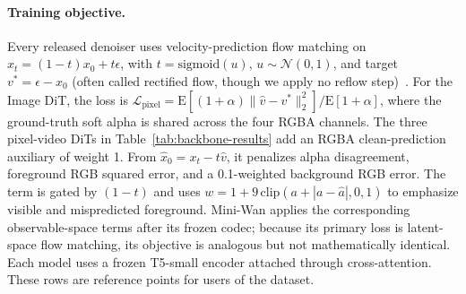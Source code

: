 \documentclass[10pt,twocolumn,letterpaper]{article}
\begin{document}
\paragraph{Training objective.} Every released denoiser uses velocity-prediction flow matching on
$x_t=(1-t)x_0+t\epsilon$, with $t=\mathrm{sigmoid}(u)$, $u\sim\mathcal N(0,1)$, and target
$v^*=\epsilon-x_0$ (often called rectified flow, though we apply no reflow step)~\cite{peebles2023dit,lipman2023flow}.
For the Image DiT, the loss is
$\mathcal L_{\mathrm{pixel}}=\mathrm E[(1+\alpha)\|\hat v-v^*\|_2^2]/\mathrm E[1+\alpha]$,
where the ground-truth soft alpha is shared across the four RGBA channels. The three pixel-video DiTs in
Table~\ref{tab:backbone-results} add an RGBA clean-prediction auxiliary of weight 1. From
$\hat x_0=x_t-t\hat v$, it penalizes alpha disagreement, foreground RGB squared error, and a 0.1-weighted
background RGB error. The term is gated by $(1-t)$ and uses
$w=1+9\,\mathrm{clip}(a+|a-\hat a|,0,1)$ to emphasize visible and mispredicted foreground. Mini-Wan applies
the corresponding observable-space terms after its frozen codec; because its primary loss is latent-space
flow matching, its objective is analogous but not mathematically identical. Each model uses a frozen
T5-small encoder attached through cross-attention. These rows are reference points for users of the dataset.
\end{document}

